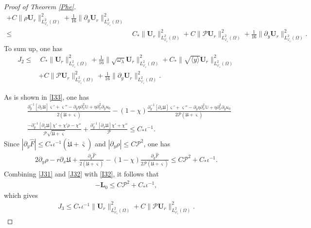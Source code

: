 \documentclass{amsart}
\numberwithin{equation}{section}
\newcommand\y{{{\langle y \rangle}}}
\begin{document}
\begin{proof}[Proof of Theorem \ref{Phe}]
\begin{align*}
     +C\|\rho\mathbf{U}_{r}\|_{L_{\varphi_{r}}^{2}(\Omega)}^{2}
     +\frac{1}{16}\|\partial_{y}\mathbf{U}_{r}\|_{L_{\varphi_{r}}^{2}(\Omega)}^{2}\\
\leq&~C_{*}\|\mathbf{U}_{r}\|_{L_{\varphi_{r}}^{2}(\Omega)}^{2}
     +C\|\mathcal{P}\mathbf{U}_{r}\|_{L_{\varphi_{r}}^{2}(\Omega)}^{2}
     +\frac{1}{16}\|\partial_{y}\mathbf{U}_{r}\|_{L_{\varphi_{r}}^{2}(\Omega)}^{2}.
\end{align*}
To sum up, one has
\begin{align*}
J_{2}
\leq&~C_{*}\|\mathbf{U}_{r}\|_{L_{\varphi_{r}}^{2}(\Omega)}^{2}
     +\frac{1}{16}\|\sqrt{\omega_{\lambda}}\mathbf{U}_{r}\|_{L_{\varphi_{r}}^{2}(\Omega)}^{2}
     +C_{*}\|\sqrt{\y}\mathbf{U}_{r}\|_{L_{\varphi_{r}}^{2}(\Omega)}^{2}\\
    &+C\|\mathcal{P}\mathbf{U}_{r}\|_{L_{\varphi_{r}}^{2}(\Omega)}^{2}
     +\frac{1}{16}\|\partial_{y}\mathbf{U}_{r}\|_{L_{\varphi_{r}}^{2}(\Omega)}^{2}.
\end{align*}

As is shown in \eqref{I33}, one has
\begin{align}\label{J31}
&\frac{\partial_{y}^{-1}\left[\partial_{x}\dot{\mathfrak{U}}\right]\varsigma'+\varsigma''-\partial_{y}\eta\partial_{x}^{2}\mathbb{U}+\eta\partial_{x}^{2}\partial_{y}u_{0}}{2(\dot{\mathfrak{U}}+\varsigma)}
 -(1-\chi)\frac{\partial_{y}^{-1}\left[\partial_{x}\mathfrak{U}\right]\varsigma'+\varsigma''-\partial_{y}\eta\partial_{x}^{2}\mathbb{U}+\eta\partial_{x}^{2}\partial_{y}u_{0}}{2\mathcal{P}(\dot{\mathfrak{U}}+\varsigma)}\\
&\frac{-\partial_{y}^{-1}[\partial_{x}\mathfrak{U}]\chi'+\chi'\rho-\chi''}{\mathcal{P}\sqrt{\dot{\mathfrak{U}}+\varsigma}}
+\frac{\partial_{y}^{-1}\left[\partial_{x}\mathfrak{U}\right]\chi'+\chi''}{\mathcal{P}}
\leq C_{*}\iota^{-1}.\nonumber
\end{align}
Since $|\partial_{y}\hat{F}|\leq C_{*}\iota^{-1}(\dot{\mathfrak{U}}+\bar{\varsigma})$ and $|\partial_{y}\rho|\leq C\mathcal{P}^{2}$, one has
\begin{align}\label{J32}
2\partial_{y}\rho-r\partial_{x}\mathfrak{U}
+\frac{\partial_{y}\hat{F}}{2(\dot{\mathfrak{U}}+\varsigma)}
-(1-\chi)\frac{\partial_{y}\hat{F}}{2\mathcal{P}(\dot{\mathfrak{U}}+\varsigma)}\leq C\mathcal{P}^{2}+C_{*}\iota^{-1}.
\end{align}
Combining \eqref{J31} and \eqref{J32} with \eqref{I32}, it follows that
\begin{align*}
-\mathbf{L}_{0}\leq C\mathcal{P}^{2}+C_{*}\iota^{-1},
\end{align*}
which gives
\begin{align*}
J_{3}
\leq C_{*}\iota^{-1}\|\mathbf{U}_{r}\|_{L_{\varphi_{r}}^{2}(\Omega)}^{2}
    +C\|\mathcal{P}\mathbf{U}_{r}\|_{L_{\varphi_{r}}^{2}(\Omega)}^{2}.
\end{align*}


\end{proof}
\end{document}
